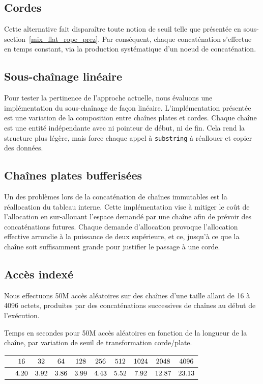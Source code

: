 \subsection{Cordes}

Cette alternative fait disparaître toute notion de seuil telle que présentée en sous-section~\ref{mix_flat_rope_prez}.
Par conséquent, chaque concaténation s'effectue en temps constant, via la production
systématique d'un noeud de concaténation.

\subsection{Sous-chaînage linéaire}

Pour tester la pertinence de l'approche actuelle, nous évaluons une implémentation
du sous-chaînage de façon linéaire.
L'implémentation présentée est une variation de la composition entre chaînes plates
et cordes.
Chaque chaîne est une entité indépendante avec ni pointeur de début, ni de fin.
Cela rend la structure plus légère, mais force chaque appel à
\texttt{substring} à réallouer et copier des données.

\subsection{Chaînes plates bufferisées}

Un des problèmes lors de la concaténation de chaînes immutables est la réallocation
du tableau interne.
Cette implémentation vise à mitiger le coût de l'allocation en sur-allouant l'espace
demandé par une chaîne afin de prévoir des concaténations futures.
Chaque demande d'allocation provoque l'allocation effective arrondie à la puissance de deux
supérieure, et ce, jusqu'à ce que la chaîne soit suffisamment grande pour justifier le
passage à une corde.

\subsection{Accès indexé}

Nous effectuons 50M accès aléatoires sur des chaînes d'une taille allant
de 16 à 4096 octets, produites par des concaténations successives de chaînes au début de l'exécution.

\begin{table}
	\caption{\label{index_maxlen_dat}Temps en secondes pour 50M accès aléatoires en fonction de la longueur de la chaîne, par variation de seuil de transformation corde/plate.}
	\centering
	$\begin{array}{ *{10}{c} }
		\toprule
		 & 16 & 32 & 64 & 128 & 256 & 512 & 1024 & 2048 & 4096\\
		\midrule
		 & 4.20 & 3.92 & 3.86 & 3.99 & 4.43 & 5.52 & 7.92 & 12.87 & 23.13\\
		\bottomrule
	\end{array}$
\end{table}

